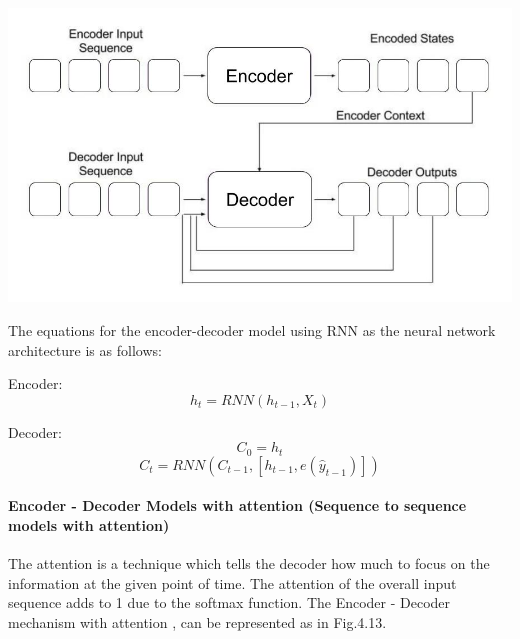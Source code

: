 				\begin{center}
				\includegraphics[width=\linewidth]{figures/Sequence-to-Sequence-Model.jpg}	
				\label{fig: Encoder - Decoder Mechanism}
				\end{center}

The equations for the encoder-decoder model using RNN as the neural network architecture is as follows:
 
Encoder: \begin{equation} h_{t} = RNN(h_{t-1}, X_{t}) \end{equation}

Decoder: \begin{equation} C_{0} = h_{t}  \end{equation}	
		 \begin{equation} C_{t} = RNN(C_{t-1}, [h_{t-1}, e(\hat{y}_{t-1})])  \end{equation}


\paragraph{Encoder - Decoder Models with attention (Sequence to sequence models with attention)}

The attention is a technique which tells the decoder how much to focus on the information at the given point of time. The attention of the overall input sequence adds to 1 due to the softmax function. The Encoder - Decoder mechanism with attention \cite{2}, \cite{7} can be represented as in Fig.4.13.

